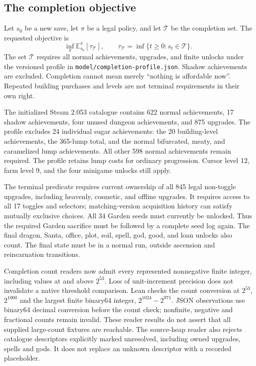 \documentclass[11pt,a4paper]{article}
\numberwithin{equation}{section}
\theoremstyle{definition}
\theoremstyle{remark}
\newcommand{\E}{\mathbb E}
\begin{document}
\subsection{The completion objective}\label{sec:completion-objective}
Let $s_0$ be a new save, let $\pi$ be a legal policy, and let $\mathcal T$ be the completion set. The requested objective is
\[
 \inf_\pi \E_{s_0}^{\pi}[\tau_{\mathcal T}],\qquad
 \tau_{\mathcal T}=\inf\{t\ge0:s_t\in\mathcal T\}.
\]
The set $\mathcal T$ requires all normal achievements, upgrades, and finite unlocks under the versioned profile in \texttt{model/completion-profile.json}. Shadow achievements are excluded. Completion cannot mean merely ``nothing is affordable now''. Repeated building purchases and levels are not terminal requirements in their own right.

The initialized Steam 2.053 catalogue contains 622 normal achievements, 17 shadow achievements, four unused dungeon achievements, and 875 upgrades. The profile excludes 24 individual sugar achievements: the 20 building-level achievements, the 365-lump total, and the normal bifurcated, meaty, and caramelized lump achievements. All other 598 normal achievements remain required. The profile retains lump costs for ordinary progression. Cursor level 12, farm level 9, and the four minigame unlocks still apply.

The terminal predicate requires current ownership of all 845 legal non-toggle upgrades, including heavenly, cosmetic, and offline upgrades. It requires access to all 17 toggles and selectors; matching-version acquisition history can satisfy mutually exclusive choices. All 34 Garden seeds must currently be unlocked. Thus the required Garden sacrifice must be followed by a complete seed log again. The final dragon, Santa, office, plot, soil, spell, god, good, and loan unlocks also count. The final state must be in a normal run, outside ascension and reincarnation transitions.

Completion count readers now admit every represented nonnegative finite integer, including values at and above $2^{53}$. Loss of unit-increment precision does not invalidate a native threshold comparison. Lean checks the count conversion at $2^{53}$, $2^{1000}$ and the largest finite binary64 integer, $2^{1024}-2^{971}$. JSON observations use binary64 decimal conversion before the count check; nonfinite, negative and fractional counts remain invalid. These reader results do not assert that all supplied large-count fixtures are reachable. The source-heap reader also rejects catalogue descriptors explicitly marked unresolved, including owned upgrades, spells and gods. It does not replace an unknown descriptor with a recorded placeholder.
\end{document}
